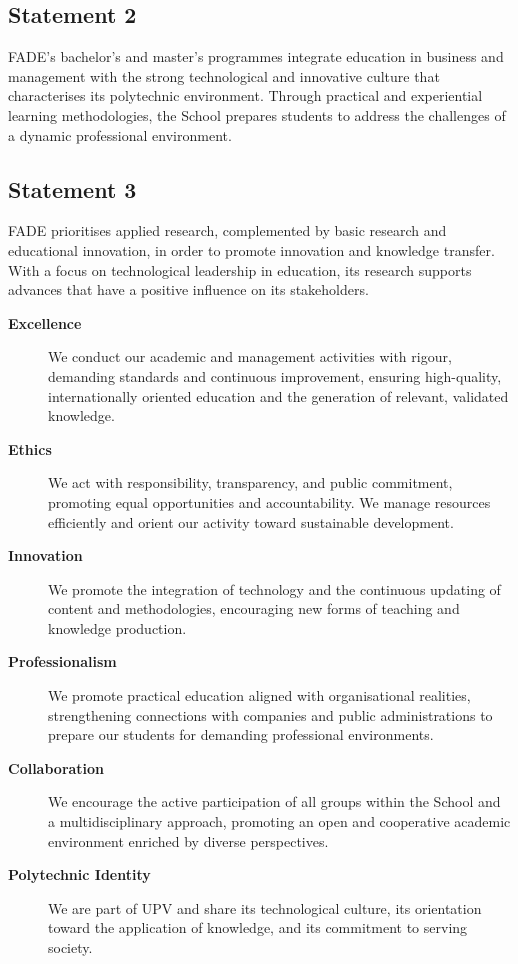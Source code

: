\documentclass[11pt,a4paper]{scrreprt}
\begin{document}
\subsection*{Statement 2}
\small FADE's bachelor's and master's programmes integrate education in business and management with the strong technological and innovative culture that characterises its polytechnic environment. Through practical and experiential learning methodologies, the School prepares students to address the challenges of a dynamic professional environment.

\subsection*{Statement 3}
\small FADE prioritises applied research, complemented by basic research and educational innovation, in order to promote innovation and knowledge transfer. With a focus on technological leadership in education, its research supports advances that have a positive influence on its stakeholders.

\begin{description}
\item[\textbf{Excellence}]
\small We conduct our academic and management activities with rigour, demanding standards and continuous improvement, ensuring high-quality, internationally oriented education and the generation of relevant, validated knowledge.
\item[\textbf{Ethics}]
\small We act with responsibility, transparency, and public commitment, promoting equal opportunities and accountability. We manage resources efficiently and orient our activity toward sustainable development.
\item[\textbf{Innovation}]
\small We promote the integration of technology and the continuous updating of content and methodologies, encouraging new forms of teaching and knowledge production.
\item[\textbf{Professionalism}]
\small We promote practical education aligned with organisational realities, strengthening connections with companies and public administrations to prepare our students for demanding professional environments.
\item[\textbf{Collaboration}]
\small We encourage the active participation of all groups within the School and a multidisciplinary approach, promoting an open and cooperative academic environment enriched by diverse perspectives.
\item[\textbf{Polytechnic Identity}]
\small We are part of UPV and share its technological culture, its orientation toward the application of knowledge, and its commitment to serving society.
\end{description}
\end{document}

